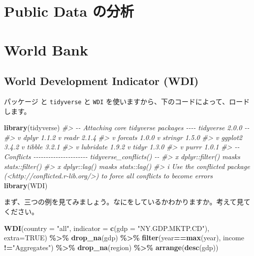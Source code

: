 \documentclass[
  xelatex, ja=standard]{bxjsbook}
\newenvironment{Shaded}{\begin{snugshade}}{\end{snugshade}}
\newcommand{\AttributeTok}[1]{\textcolor[rgb]{0.13,0.29,0.53}{#1}}
\newcommand{\CommentTok}[1]{\textcolor[rgb]{0.56,0.35,0.01}{\textit{#1}}}
\newcommand{\ConstantTok}[1]{\textcolor[rgb]{0.56,0.35,0.01}{#1}}
\newcommand{\FunctionTok}[1]{\textcolor[rgb]{0.13,0.29,0.53}{\textbf{#1}}}
\newcommand{\NormalTok}[1]{#1}
\newcommand{\SpecialCharTok}[1]{\textcolor[rgb]{0.81,0.36,0.00}{\textbf{#1}}}
\newcommand{\StringTok}[1]{\textcolor[rgb]{0.31,0.60,0.02}{#1}}
\theoremstyle{definition}
\theoremstyle{definition}
\theoremstyle{definition}
\theoremstyle{definition}
\theoremstyle{remark}
\begin{document}
\hypertarget{publicdata}{%
\chapter{Public Data の分析}\label{publicdata}}

\hypertarget{worldbank}{%
\chapter{World Bank}\label{worldbank}}

\hypertarget{world-development-indicator-wdi}{%
\section{World Development Indicator (WDI)}\label{world-development-indicator-wdi}}

パッケージ と \texttt{tidyverse} と \texttt{WDI} を使いますから、下のコードによって、ロードします。

\begin{Shaded}
\begin{Highlighting}[]
\FunctionTok{library}\NormalTok{(tidyverse)}
\CommentTok{\#\textgreater{} {-}{-} Attaching core tidyverse packages {-}{-}{-}{-} tidyverse 2.0.0 {-}{-}}
\CommentTok{\#\textgreater{} v dplyr     1.1.2     v readr     2.1.4}
\CommentTok{\#\textgreater{} v forcats   1.0.0     v stringr   1.5.0}
\CommentTok{\#\textgreater{} v ggplot2   3.4.2     v tibble    3.2.1}
\CommentTok{\#\textgreater{} v lubridate 1.9.2     v tidyr     1.3.0}
\CommentTok{\#\textgreater{} v purrr     1.0.1     }
\CommentTok{\#\textgreater{} {-}{-} Conflicts {-}{-}{-}{-}{-}{-}{-}{-}{-}{-}{-}{-}{-}{-}{-}{-}{-}{-}{-}{-}{-}{-} tidyverse\_conflicts() {-}{-}}
\CommentTok{\#\textgreater{} x dplyr::filter() masks stats::filter()}
\CommentTok{\#\textgreater{} x dplyr::lag()    masks stats::lag()}
\CommentTok{\#\textgreater{} i Use the conflicted package (\textless{}http://conflicted.r{-}lib.org/\textgreater{}) to force all conflicts to become errors}
\FunctionTok{library}\NormalTok{(WDI)}
\end{Highlighting}
\end{Shaded}

まず、三つの例を見てみましょう。なにをしているかわかりますか。考えて見てください。

\begin{Shaded}
\begin{Highlighting}[]
\FunctionTok{WDI}\NormalTok{(}\AttributeTok{country =} \StringTok{"all"}\NormalTok{, }\AttributeTok{indicator =} \FunctionTok{c}\NormalTok{(}\AttributeTok{gdp =} \StringTok{"NY.GDP.MKTP.CD"}\NormalTok{),}
    \AttributeTok{extra=}\ConstantTok{TRUE}\NormalTok{) }\SpecialCharTok{\%\textgreater{}\%} \FunctionTok{drop\_na}\NormalTok{(gdp) }\SpecialCharTok{\%\textgreater{}\%}
  \FunctionTok{filter}\NormalTok{(year}\SpecialCharTok{==}\FunctionTok{max}\NormalTok{(year), income }\SpecialCharTok{!=}\StringTok{"Aggregates"}\NormalTok{) }\SpecialCharTok{\%\textgreater{}\%} 
  \FunctionTok{drop\_na}\NormalTok{(region) }\SpecialCharTok{\%\textgreater{}\%} \FunctionTok{arrange}\NormalTok{(}\FunctionTok{desc}\NormalTok{(gdp))}
\end{Highlighting}
\end{Shaded}
\end{document}
